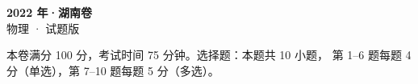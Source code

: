 \documentclass[zihao=-4, a4paper]{ctexart}
\begin{document}
\setlength{\abovedisplayskip}{5pt plus 2pt minus 2pt}
\setlength{\belowdisplayskip}{5pt plus 2pt minus 2pt}
\setlength{\abovedisplayshortskip}{2pt plus 1pt}
\setlength{\belowdisplayshortskip}{3pt plus 1pt minus 1pt}
\begin{center}
  {\Large\bfseries 2022 年·湖南卷}\\[4pt]
  {\large 物理 · 试题版}
\end{center}
\medskip
\begin{gknotice}
  本卷满分 100 分，考试时间 75 分钟。选择题：本题共 10 小题，
  第 1--6 题每题 4 分（单选），第 7--10 题每题 5 分（多选）。
\end{gknotice}

\end{document}
